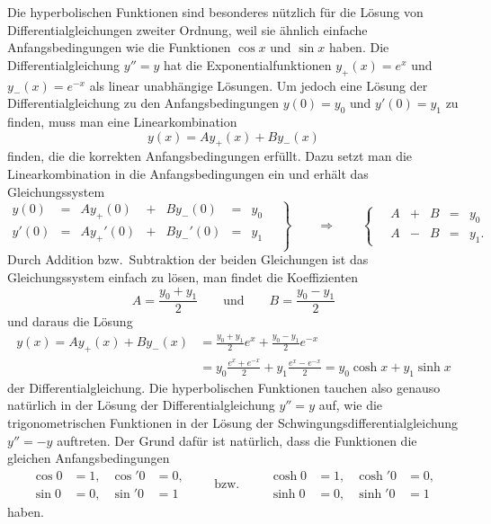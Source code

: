 Die hyperbolischen Funktionen sind besonderes nützlich für die Lösung
von Differentialgleichungen zweiter Ordnung, weil sie ähnlich einfache 
Anfangsbedingungen wie die Funktionen $\cos x$ und $\sin x$ haben.
Die Differentialgleichung $y''=y$ hat die Exponentialfunktionen 
$y_+(x)=e^x$ und $y_-(x)=e^{-x}$ als linear unabhängige Lösungen.
Um jedoch eine Lösung der Differentialgleichung zu den Anfangsbedingungen
$y(0)=y_0$ und $y'(0)=y_1$ zu finden, muss man eine Linearkombination
\[
y(x) = A y_+(x) + B y_-(x)
\]
finden, die die korrekten Anfangsbedingungen erfüllt. 
Dazu setzt  man die Linearkombination in die Anfangsbedingungen ein
und erhält das Gleichungssystem
%
\[
\renewcommand{\arraycolsep}{2pt}
\left.
\begin{array}{rcrcrcr}
y(0)  &=& A y_+(0)  &+& B y_-(0)  &=& y_0 \\
y'(0) &=& A y_+'(0) &+& B y_-'(0) &=& y_1 \\
\end{array}
\quad
\right\}
\qquad
\Rightarrow
\qquad
\left\{
\quad
\begin{array}{rcrcl}
A &+& B &=& y_0 \\
A &-& B &=& y_1.
\end{array}
\right.
\]
Durch Addition bzw.~Subtraktion der beiden Gleichungen ist das 
Gleichungssystem einfach zu lösen, man findet die Koeffizienten
\[
A
=
\frac{y_0+y_1}2
\qquad\text{und}\qquad
B
=
\frac{y_0-y_1}2
\]
und daraus die Lösung
\begin{align*}
y(x)
=
Ay_+(x) + By_-(x)
&=
\frac{y_0+y_1}2 e^x
+
\frac{y_0-y_1}2 e^{-x}
\\
&=
y_0
\frac{e^x+e^{-x}}2
+
y_1
\frac{e^x-e^{-x}}2
=
y_0\cosh x + y_1 \sinh x
\end{align*}
der Differentialgleichung.
Die hyperbolischen Funktionen tauchen also genauso natürlich in der
Lösung der Differentialgleichung $y''=y$ auf, wie die trigonometrischen
Funktionen in der Lösung der Schwingungsdifferentialgleichung $y''=-y$
auftreten.
Der Grund dafür ist natürlich, dass die Funktionen die gleichen
Anfangsbedingungen
\[
\begin{aligned}
\cos  0 &= 1,& \cos'  0 &= 0,\\
\sin  0 &= 0,& \sin'  0 &= 1
\end{aligned}
\qquad\text{bzw.}\qquad
\begin{aligned}
\cosh 0 &= 1,& \cosh' 0 &= 0,\\
\sinh 0 &= 0,& \sinh' 0 &= 1
\end{aligned}
\]
haben.


